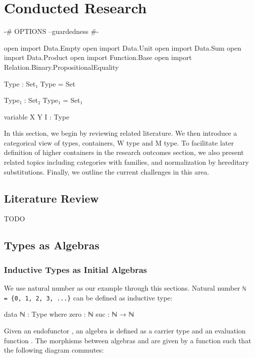 \chapter{Conducted Research}

\begin{code}[hide]
{-# OPTIONS --guardedness #-}

open import Data.Empty
open import Data.Unit
open import Data.Sum
open import Data.Product
open import Function.Base
open import Relation.Binary.PropositionalEquality

Type : Set₁
Type = Set

Type₁ : Set₂
Type₁ = Set₁

variable X Y I : Type
\end{code}

In this section, we begin by reviewing related literature. We then introduce a categorical view of types, containers, W type and M type. To facilitate later definition of higher containers in the research outcomes section, we also present related topics including categories with families, and normalization by hereditary substitutions. Finally, we outline the current challenges in this area.

\section{Literature Review}
TODO

\section{Types as Algebras}

\subsection{Inductive Types as Initial Algebras}

We use natural number as our example through this sections. Natural number \texttt{ℕ = \{0, 1, 2, 3, ...\}} can be defined as inductive type:
\begin{code}
data ℕ : Type where
  zero : ℕ
  suc : ℕ → ℕ
\end{code}

Given an endofunctor  \AgdaSymbol{:}   , an algebra is defined as a carrier type  \AgdaSymbol{:}  and an evaluation function  \AgdaSymbol{:}    . The morphisms between algebras \AgdaSymbol{(} \AgdaInductiveConstructor{,} \AgdaSymbol{)} and \AgdaSymbol{(} \AgdaInductiveConstructor{,} \AgdaSymbol{)} are given by a function  \AgdaSymbol{:}    such that the following diagram commutes:

